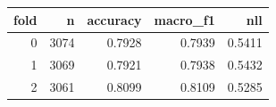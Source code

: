 \begin{tabular}{rrrrr}
\toprule
fold & n & accuracy & macro\_f1 & nll \\
\midrule
0 & 3074 & 0.7928 & 0.7939 & 0.5411 \\
1 & 3069 & 0.7921 & 0.7938 & 0.5432 \\
2 & 3061 & 0.8099 & 0.8109 & 0.5285 \\
\bottomrule
\end{tabular}
